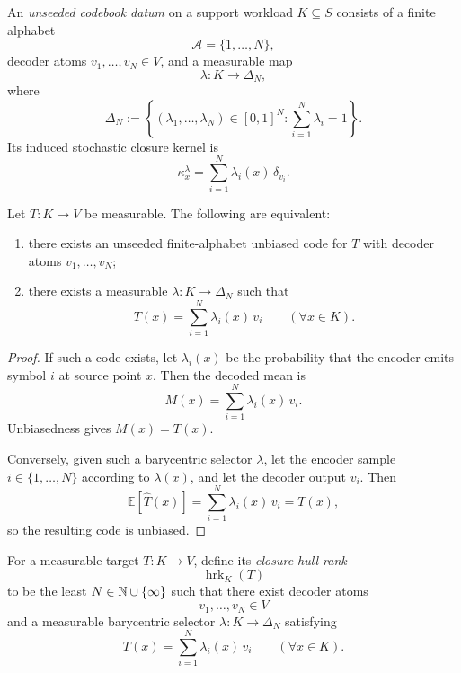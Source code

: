 \begin{definition}
\label{def:unseeded-codebook-datum}
An \emph{unseeded codebook datum} on a support workload \(K\subseteq S\)
consists of a finite alphabet
\[
\mathcal A=\{1,\dots,N\},
\]
decoder atoms \(v_1,\dots,v_N\in V\), and a measurable map
\[
\lambda:K\to \Delta_N,
\]
where
\[
\Delta_N:=\left\{(\lambda_1,\dots,\lambda_N)\in [0,1]^N:
\sum_{i=1}^N\lambda_i=1\right\}.
\]
Its induced stochastic closure kernel is
\[
\kappa^{\lambda}_x
=
\sum_{i=1}^{N}\lambda_i(x)\,\delta_{v_i}.
\]
\end{definition}

\begin{theorem}
\label{thm:barycentric-exactness-criterion}
Let \(T:K\to V\) be measurable. The following are equivalent:
\begin{enumerate}[label=(\roman*), leftmargin=2em, itemsep=0.2em]
\item there exists an unseeded finite-alphabet unbiased code for \(T\) with
      decoder atoms \(v_1,\dots,v_N\);
\item there exists a measurable \(\lambda:K\to\Delta_N\) such that
      \[
      T(x)=\sum_{i=1}^{N}\lambda_i(x)\,v_i
      \qquad (\forall x\in K).
      \]
\end{enumerate}
\end{theorem}

\begin{proof}
If such a code exists, let \(\lambda_i(x)\) be the probability that the encoder
emits symbol \(i\) at source point \(x\). Then the decoded mean is
\[
M(x)=\sum_{i=1}^{N}\lambda_i(x)\,v_i.
\]
Unbiasedness gives \(M(x)=T(x)\).

Conversely, given such a barycentric selector \(\lambda\), let the encoder
sample \(i\in\{1,\dots,N\}\) according to \(\lambda(x)\), and let the decoder
output \(v_i\). Then
\[
\mathbb E[\widehat T(x)]
=
\sum_{i=1}^{N}\lambda_i(x)\,v_i
=
T(x),
\]
so the resulting code is unbiased.
\end{proof}

\begin{definition}
\label{def:closure-hull-rank}
For a measurable target \(T:K\to V\), define its \emph{closure hull rank}
\[
\operatorname{hrk}_{K}(T)
\]
to be the least \(N\in\mathbb{N}\cup\{\infty\}\) such that there exist decoder atoms
\[
v_1,\dots,v_N\in V
\]
and a measurable barycentric selector \(\lambda:K\to \Delta_N\) satisfying
\[
T(x)=\sum_{i=1}^{N}\lambda_i(x)\,v_i
\qquad (\forall x\in K).
\]
\end{definition}

